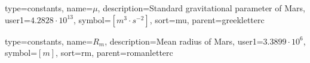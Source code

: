 {
type=constants, %
name={\ensuremath{\mu}}, %
description={Standard gravitational parameter of Mars}, %
user1={$4.2828\cdot 10^{13}$}, %
symbol={$\left[m^3\cdot s^{-2}\right]$}, %
sort=mu, %
parent=greekletterc %
}

{
type=constants, %
name={\ensuremath{R_m}}, %
description={Mean radius of Mars}, %
user1={$3.3899\cdot 10^{6}$}, %
symbol={$\left[m\right]$}, %
sort=rm, %
parent=romanletterc %
}